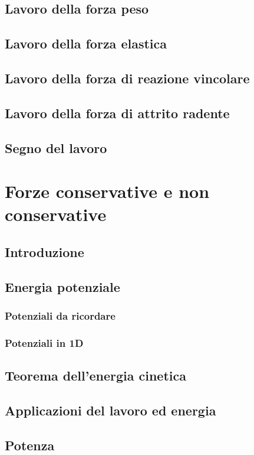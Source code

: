 \documentclass[a4paper]{article}
\begin{document}
\subsection{Lavoro della forza peso}
\subsection{Lavoro della forza elastica}
\subsection{Lavoro della forza di reazione vincolare}
\subsection{Lavoro della forza di attrito radente}
\subsection{Segno del lavoro}

\newpage

\section{Forze conservative e non conservative}
\subsection{Introduzione}
\subsection{Energia potenziale}
\subsubsection*{Potenziali da ricordare}
\subsubsection*{Potenziali in 1D}
\subsection{Teorema dell'energia cinetica}
\subsection{Applicazioni del lavoro ed energia}
\subsection{Potenza}
\end{document}
